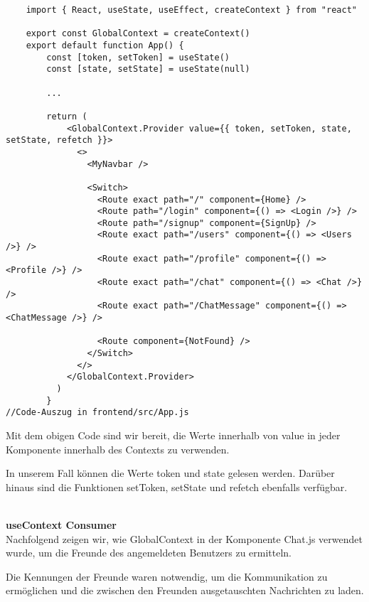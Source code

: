  \begin{lstlisting}
    import { React, useState, useEffect, createContext } from "react"

    export const GlobalContext = createContext()
    export default function App() {
        const [token, setToken] = useState()
        const [state, setState] = useState(null)
        
        ...
   
        return (
            <GlobalContext.Provider value={{ token, setToken, state, setState, refetch }}>
              <>
                <MyNavbar />
        
                <Switch>
                  <Route exact path="/" component={Home} />
                  <Route path="/login" component={() => <Login />} />
                  <Route path="/signup" component={SignUp} />
                  <Route exact path="/users" component={() => <Users />} />
                  <Route exact path="/profile" component={() => <Profile />} />
                  <Route exact path="/chat" component={() => <Chat />} />
                  <Route exact path="/ChatMessage" component={() => <ChatMessage />} />
        
                  <Route component={NotFound} />
                </Switch>
              </>
            </GlobalContext.Provider>
          )
        }
//Code-Auszug in frontend/src/App.js
 \end{lstlisting}
 Mit dem obigen Code sind wir bereit, die Werte innerhalb von value in jeder Komponente innerhalb des Contexts zu verwenden.

 In unserem Fall können die Werte token und state gelesen werden. Darüber hinaus sind die Funktionen setToken, setState und refetch ebenfalls verfügbar.
\\\\
\newpage

\textbf{useContext Consumer} \\
Nachfolgend zeigen wir, wie GlobalContext in der Komponente Chat.js verwendet wurde, um die Freunde des angemeldeten Benutzers zu ermitteln.

Die Kennungen der Freunde waren notwendig, um die Kommunikation zu ermöglichen und die zwischen den Freunden ausgetauschten Nachrichten zu laden.

